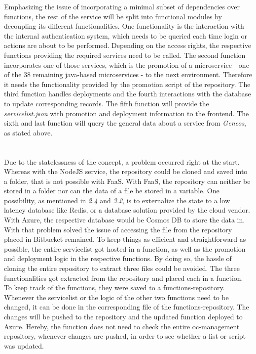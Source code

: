 \documentclass[a4paper,11pt, pagesize]{scrartcl}
\begin{document}
\begin{spacing}{1.2}
Emphasizing the issue of incorporating a minimal subset of dependencies over functions, the rest of the service will be split into functional modules by decoupling its different functionalities. One functionality is the interaction with the internal authentication system, which needs to be queried each time login or actions are about to be performed. Depending on the access rights, the respective functions providing the required services need to be called. The second function incorporates one of those services, which is the promotion of a microservice - one of the 38 remaining java-based microservices - to the next environment. Therefore it needs the functionality provided by the promotion script of the repository. The third function handles deployments and the fourth interactions with the database to update corresponding records. The fifth function will provide the \textit{servicelist.json} with promotion and deployment information to the frontend. The sixth and last function will query the general data about a service from \textit{Geneos}, as stated above.\\\\\\Due to the statelessness of the concept, a problem occurred right at the start. Whereas with the NodeJS service, the repository could be cloned and saved into a folder, that is not possible with FaaS. With FaaS, the repository can neither be stored in a folder nor can the data of a file be stored in a variable. One possibility, as mentioned in \textit{2.4} and \textit{3.2}, is to externalize the state to a low latency database like Redis, or a database solution provided by the cloud vendor. With Azure, the respective database would be Cosmos DB to store the data in. With that problem solved the issue of accessing the file from the repository placed in Bitbucket remained. To keep things as efficient and straightforward as possible, the entire servicelist got hosted in a function, as well as the promotion and deployment logic in the respective functions. By doing so, the hassle of cloning the entire repository to extract three files could be avoided. The three functionalities got extracted from the repository and placed each in a function. To keep track of the functions, they were saved to a functions-repository. Whenever the servicelist or the logic of the other two functions need to be changed, it can be done in the corresponding file of the functions-repository. The changes will be pushed to the repository and the updated function deployed to Azure. Hereby, the function does not need to check the entire oc-management repository, whenever changes are pushed, in order to see whether a list or script was updated. 

\end{spacing}
\end{document}
